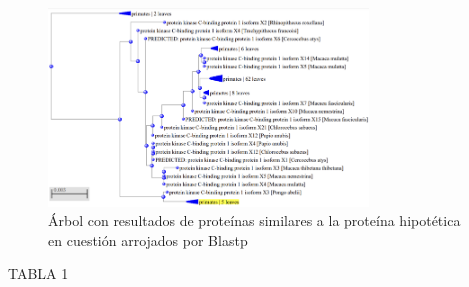 \documentclass[journal,transmag]{IEEEtran}
\begin{document}
\begin{figure}[!h]
	\center
	\includegraphics[width=8.5cm]{imagenes/similitudes.png}
	\caption{Árbol con resultados de proteínas similares a la proteína hipotética en cuestión arrojados por Blastp}
	\label{2}
\end{figure}

TABLA 1
\end{document}
